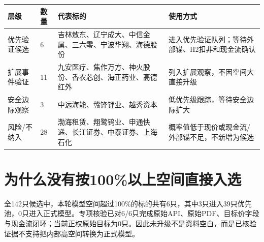 \noindent
\begin{exhibitbox}[图表 3｜补证后候选准入摘要]
\scriptsize
\begin{tabularx}{\textwidth}{L{2.5cm}R{0.9cm}L{4.0cm}X}
\toprule
\textbf{层级} & \textbf{数量} & \textbf{代表标的} & \textbf{使用方式} \\
\midrule
优先验证候选 & 6 & 吉林敖东、辽宁成大、中信金属、三六零、宁波华翔、海德股份 & 进入优先验证队列；等待外部锚、H2扣非和现金流确认 \\
扩展事件验证 & 11 & 九安医疗、焦作万方、神火股份、香农芯创、海正药业、高德红外 & 列入扩展观察，不因空间大直接升级 \\
安全边际观察 & 3 & 中远海能、赣锋锂业、越秀资本 & 低优先级跟踪，等待安全边际扩大 \\
风险/不纳入 & 28 & 渤海租赁、翔鹭钨业、申通快递、长江证券、中泰证券、上海石化 & 概率值低于现价或现金流/外部锚不足，不新增为候选 \\
\bottomrule
\end{tabularx}
\normalsize
{}
\end{exhibitbox}

\section{为什么没有按100\%以上空间直接入选}

全142只候选中，本轮模型空间超过100\%的标的共有6只，其中3只进入39只优先池，0只进入正式模型。专项核验已对6/6只完成原始API、原始PDF、目标价字段与现金流闭环；当前正权原始目标为0只。因此未升级不是资料空白，而是已核验证据不支持把内部高空间转换为正式模型。

